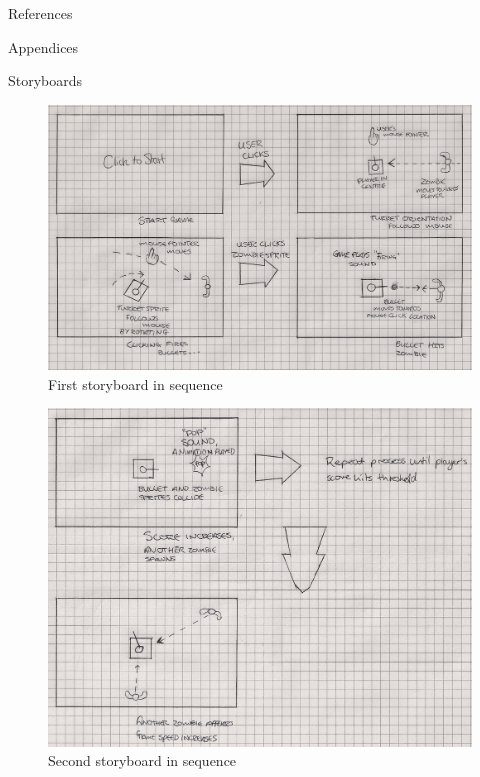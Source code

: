 \documentclass[11pt]{article}
\begin{document}
\nocite{LaTeXTemplate}

\newpage
\begin{section}{References}
	
	
\end{section}

\begin{section}{Appendices}
\label{appendices}
    \begin{subsection}{Storyboards}
        \begin{landscape}
            \begin{figure}[htp]
	    		\centering
                    \includegraphics[height=0.6\columnwidth]{img/storyboard_1}
	    		\caption{First storyboard in sequence}
    		\end{figure}
    		
    		\clearpage
    		\begin{figure}[htp]
	    		\centering
                    \includegraphics[height=0.7\columnwidth]{img/storyboard_2}
	    		\caption{Second storyboard in sequence}
    		\end{figure}
    		

\end{landscape}
\end{subsection}
\end{section}
\end{document}
